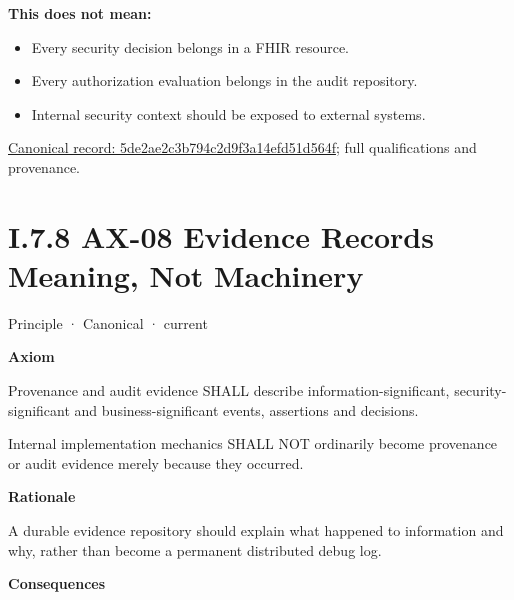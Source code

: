 \textbf{This does not mean:}



\begin{itemize}


\item Every security decision belongs in a FHIR resource.

\item Every authorization evaluation belongs in the audit repository.

\item Internal security context should be exposed to external systems.

\end{itemize}

{\footnotesize \href{../../../../../../../continuum/motivation/principle/5de2ae2c3b794c2d9f3a14efd51d564f.md}{Canonical record: 5de2ae2c3b794c2d9f3a14efd51d564f}; full qualifications and provenance.}\par
\section*{I.7.8 AX-08 Evidence Records Meaning, Not Machinery}
\label{navigation:I.7.8}

\label{element:21d6864657964ba5b03e3f6b5eb29cd5}
{\small Principle · Canonical · current}\par

\par\medskip\textbf{Axiom}\par


Provenance and audit evidence SHALL describe information-significant,
security-significant and business-significant events, assertions and
decisions.



Internal implementation mechanics SHALL NOT ordinarily become provenance
or audit evidence merely because they occurred.



\par\medskip\textbf{Rationale}\par


A durable evidence repository should explain what happened to
information and why, rather than become a permanent distributed debug
log.



\par\medskip\textbf{Consequences}\par


